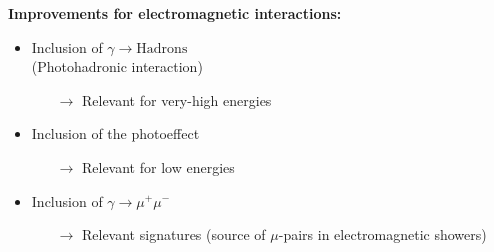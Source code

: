 \begin{frame}

\begin{columns}[onlytextwidth]
    \begin{column}{0.45\textwidth}
    	\textbf{Improvements for electromagnetic interactions:}
    	\begin{itemize}
    		\item Inclusion of $\gamma \to \text{Hadrons}$ \\(Photohadronic interaction)
            \begin{itemize}
                \item[$\rightarrow$] Relevant for very-high energies
            \end{itemize}
    		\item Inclusion of the photoeffect
            \begin{itemize}
                \item[$\rightarrow$] Relevant for low energies
            \end{itemize}
            \item Inclusion of $\gamma \to \mu^+ \mu^-$
            \begin{itemize}
                \item[$\rightarrow$] Relevant signatures (source of $\mu$-pairs in electromagnetic showers)
            \end{itemize}
    	\end{itemize}


    \end{column}
    \begin{column}{0.55\textwidth}


\end{column}
\end{columns}
\end{frame}
